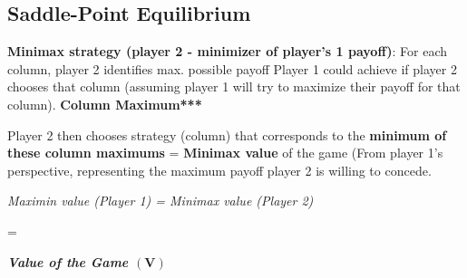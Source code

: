 \documentclass[../Main.tex]{subfiles}
\begin{document}
\subsection{Saddle-Point Equilibrium}


\textbf{Minimax strategy (player 2 - minimizer of player's 1 payoff)}: For each column, player 2 identifies max. possible payoff Player 1 could achieve if player 2 chooses that column (assuming player 1 will try to maximize their payoff for that column). \textbf{Column Maximum***}

Player 2 then chooses strategy (column) that corresponds to the \textbf{minimum of these column maximums} = \textbf{Minimax value} of the game (From player 1's perspective, representing the maximum payoff player 2 is willing to concede. 
\begin{center}
    \textit{Maximin value (Player 1) = Minimax value (Player 2)}

    =

    \textit{\textbf{Value of the Game $(\mathbf{V})$}}
\end{center}

\end{document}
